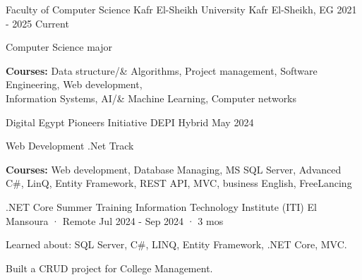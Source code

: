 

\begin{cventries}

  \cventry
    {Faculty of Computer Science} %
    {Kafr El-Sheikh University} %
    {Kafr El-Sheikh, EG} %
    {2021 - 2025 Current} %
    {
      \begin{cvitems} %
        \item {Computer Science major}
        \item {\textbf{Courses:} Data structure/\& Algorithms, Project management, Software Engineering, Web development,\\ Information Systems, AI/\& Machine Learning, Computer networks}
      \end{cvitems}
    }  
     \cventry
    {Digital Egypt Pioneers Initiative} %
    {DEPI} %
    {Hybrid} %
    {May 2024} %
    {
      \begin{cvitems} %
        \item {Web Development .Net Track}
        \item {\textbf{Courses:} Web development, Database Managing, MS SQL Server, Advanced C#, LinQ, Entity Framework, REST API, MVC, business English, FreeLancing }
      \end{cvitems}
    }  
     \cventry
    {.NET Core Summer Training} %
    {Information Technology Institute (ITI)} %
    {El Mansoura · Remote} %
    {Jul 2024 - Sep 2024 · 3 mos} %
    {
      \begin{cvitems} %
        \item {Learned about: SQL Server, C\#, LINQ, Entity Framework, .NET Core, MVC.}
        \item {Built a CRUD project for College Management.}
      \end{cvitems}
    }  
\end{cventries}
